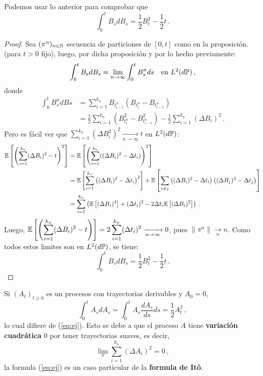 \begin{example}
Podemos usar lo anterior para comprobar que 
$$\int_{0}^{t} B_s dB_s = \frac{1}{2} B_t^2 - \frac{1}{2}t \,.$$
\end{example}
\gris
\begin{proof}
Sea $(\pi^{n})_{n \in \N}$ secuencia de particiones de $[0,t]$ como en la proposición. (para $t >0$ fijo), luego, por dicha proposición y por lo hecho previamente:
\begin{equation*}
    \int_{0}^{t} B_s dB_s = \lim_{n \to \infty} \int_{0}^{t} B_s^n ds ~ ~ ~ \text{en } L^{2}(d\P)\,,
\end{equation*}
donde 
\begin{align*}
    \int_{0}^{t} B_s^n dBs 
    &= \sum_{i=1}^{k_n} B_{t_{i-1}^n}(B_{t_{i}^n} - B_{t_{i-1}^n}) \\ 
    &= \frac{1}{2} \sum_{i=1}^{k_n} (B_{t_{i}^n}^2 - B_{t_{i-1}^n}^2) -
    \frac{1}{2} \sum_{i=1}^{k_n} (\Delta B_i)^2\,.
\end{align*}
Pero es fácil ver que $\displaystyle\sum_{i=1}^{k_n} (\Delta B_i^2)^2 \xrightarrow[n \to \infty]{} t$ en 
$L^2(d\P)$: 
\begin{align*}
    \E \left[ \left( \sum_{i=1}^{k_n} (\Delta B_i)^2 - t \right)^2 \right]
    & = \E \left[ \left( \sum_{i=1}^{k_n} ((\Delta B_i)^2 - \Delta t_i)  \right)^2 \right] \\
    &= \E \left[ \sum_{i=1}^{k_n} \left( (\Delta B_i)^2 - \Delta t_i  \right)^2 \right] + \E \left[ \sum_{i \neq j} \left( (\Delta B_i)^2 - \Delta t_i \right) \left( (\Delta B_j)^2 - \Delta t_j \right) \right] \\
    &= \sum_{i=1}^{k_n} \left( \E \left[ (\Delta B_i)^4 \right] + (\Delta t_i)^2 -2\Delta t_i \E \left[ (\Delta B_i)^2 \right] \right)\,.
\end{align*}
Luego, $\displaystyle \E \left[ \left( \sum_{i=1}^{k_n} (\Delta B_i )^2 - t \right)  \right] = 2 \sum_{i=1}^{k_n} (\Delta t_i)^2 \xrightarrow[n \to \infty]{} 0$, pues $\|\pi^n\| \xrightarrow[n]{} n$. Como todos estos limites son en $L^2(d\P)$, se tiene:
\begin{equation*}
    \label{eq:ej}
    \tag{*}
    \int_{0}^{t} B_s dB_s = \frac{1}{2} B_t^2 - \frac{1}{2}t \,.
\end{equation*}
\findem
\negro
\end{proof}

\begin{remark}
Si $(A_t)_{t \ge 0}$ es un procesos con trayectorias derivables y $A_0 = 0$, 
\begin{equation*}
    \int_{0}^{t} A_s dA_s = \int_{0}^{t} A_s \frac{dA_s}{ds} ds = \frac{1}{2} A^2_t\,,
\end{equation*}
lo cual difiere de (\ref{eq:ej}). Esto se debe a que el proceso $A$ tiene \textbf{variación cuadrática} $0$ por tener trayectorias suaves, es decir, 
\begin{equation*}
    \lim_{n} \sum_{i=1}^{k_n} (\Delta A_i)^2 = 0\,,
\end{equation*}
la formula (\ref{eq:ej}) es un caso particular de la \textbf{formula de It\^{o}}.
\end{remark}

